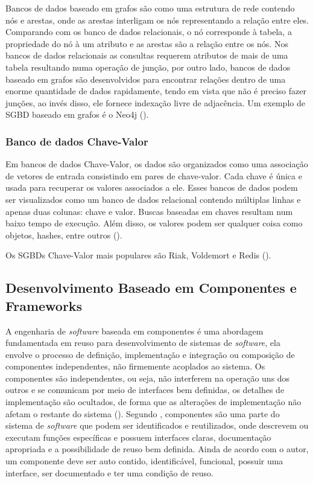 Bancos de dados baseado em grafos são como uma estrutura de rede contendo nós e arestas, onde as arestas interligam os nós representando a relação entre eles. Comparando com os banco de dados relacionais, o nó corresponde à tabela, a propriedade do nó à um atributo e as arestas são a relação entre os nós. Nos bancos de dados relacionais as consultas requerem atributos de mais de uma tabela resultando numa operação de junção, por outro lado, bancos de dados baseado em grafos são desenvolvidos para encontrar relações dentro de uma enorme quantidade de dados rapidamente, tendo em vista que não é preciso fazer junções, ao invés disso, ele fornece indexação livre de adjacência. Um exemplo de SGBD baseado em grafos é o Neo4j (\cite{kaur:2013}).

\subsubsection{Banco de dados Chave-Valor}

Em bancos de dados Chave-Valor, os dados são organizados como uma associação de vetores de entrada consistindo em pares de chave-valor. Cada chave é única e usada para recuperar os valores associados a ele. Esses bancos de dados podem ser visualizados como um banco de dados relacional contendo múltiplas linhas e apenas duas colunas: chave e valor. Buscas baseadas em chaves resultam num baixo tempo de execução. Além disso, os valores podem ser qualquer coisa como objetos, hashes, entre outros (\cite{kaur:2013}).

Os SGBDs Chave-Valor mais populares são Riak, Voldemort e Redis (\cite{kaur:2013}).


\subsection{Desenvolvimento Baseado em Componentes e Frameworks}

A engenharia de \textit{software} baseada em componentes é uma abordagem fundamentada em reuso para desenvolvimento de sistemas de \textit{software}, ela envolve o processo de definição, implementação e integração ou composição de componentes independentes, não firmemente acoplados ao sistema. Os componentes são independentes, ou seja, não interferem na operação uns dos outros e se comunicam por meio de interfaces bem definidas, os detalhes de implementação são ocultados, de forma que as alterações de implementação não afetam o restante do sistema (\cite{sommerville:2013}). Segundo \cite{sametinger:1997}, componentes são uma parte do sistema de \textit{software} que podem ser identificados e reutilizados, onde descrevem ou executam funções específicas e possuem interfaces claras, documentação apropriada e a possibilidade de reuso bem definida. Ainda de acordo com o autor, um componente deve ser auto contido, identificável, funcional, possuir uma interface, ser documentado e ter uma condição de reuso. 

